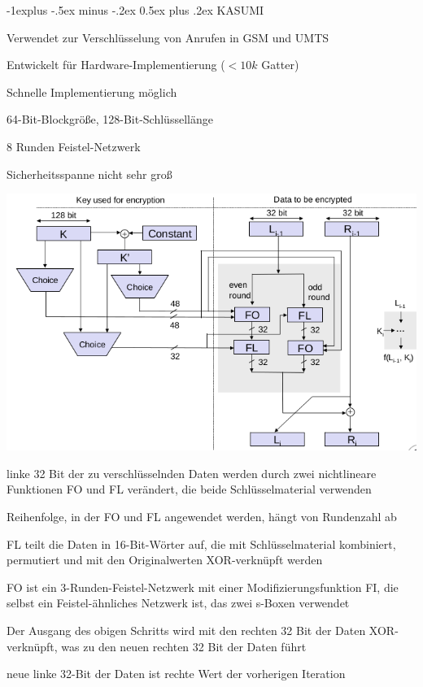 \documentclass[a4paper]{article}
\makeatletter
\renewcommand{\subsection}{\@startsection{subsection}{2}{0mm}%
 {-1explus -.5ex minus -.2ex}%
 {0.5ex plus .2ex}%
 {\normalfont\normalsize\bfseries}}
\makeatother
\begin{document}
\begin{multicols}{3}
      \subsection{KASUMI}
      \begin{itemize*}
            \item Verwendet zur Verschlüsselung von Anrufen in GSM und UMTS
            \item Entwickelt für Hardware-Implementierung ($<10k$ Gatter)
            \item Schnelle Implementierung möglich
            \item 64-Bit-Blockgröße, 128-Bit-Schlüssellänge
            \item 8 Runden Feistel-Netzwerk
            \item Sicherheitsspanne nicht sehr groß
      \end{itemize*}
      \begin{center}
            \includegraphics[width=.6\linewidth]{Assets/NetworkSecurity-kasumi-singe-iteration.png}
      \end{center}
      \begin{itemize*}
            \item linke 32 Bit der zu verschlüsselnden Daten werden durch zwei nichtlineare Funktionen FO und FL verändert, die beide Schlüsselmaterial verwenden
            \item Reihenfolge, in der FO und FL angewendet werden, hängt von Rundenzahl ab
            \item FL teilt die Daten in 16-Bit-Wörter auf, die mit Schlüsselmaterial kombiniert, permutiert und mit den Originalwerten XOR-verknüpft werden
            \item FO ist ein 3-Runden-Feistel-Netzwerk mit einer Modifizierungsfunktion FI, die selbst ein Feistel-ähnliches Netzwerk ist, das zwei s-Boxen verwendet
            \item Der Ausgang des obigen Schritts wird mit den rechten 32 Bit der Daten XOR-verknüpft, was zu den neuen rechten 32 Bit der Daten führt
            \item neue linke 32-Bit der Daten ist rechte Wert der vorherigen Iteration
      \end{itemize*}


\end{multicols}
\end{document}
